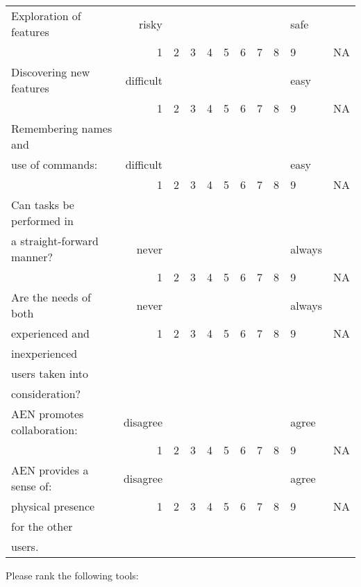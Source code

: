 \begin{table}
\begin{tabular}{lrccccccclc}\\
\hline
Exploration of features&risky&&&&&&&&safe&\\
&1&2&3&4&5&6&7&8&9&NA\\
\hline
Discovering new features&difficult&&&&&&&&easy&\\
&1&2&3&4&5&6&7&8&9&NA\\
\hline
Remembering names and\\
 use of commands:&difficult&&&&&&&&easy&\\
&1&2&3&4&5&6&7&8&9&NA\\
\hline
Can tasks be performed in\\
 a straight-forward manner?&never&&&&&&&&always&\\
&1&2&3&4&5&6&7&8&9&NA\\
\hline
Are the needs of both&never&&&&&&&&always&\\
 experienced and&1&2&3&4&5&6&7&8&9&NA\\
 inexperienced\\
 users taken into\\
 consideration?\\
\hline
AEN promotes collaboration:&disagree&&&&&&&&agree&\\
&1&2&3&4&5&6&7&8&9&NA\\
\hline
AEN provides a sense of:&disagree&&&&&&&&agree&\\
 physical presence&1&2&3&4&5&6&7&8&9&NA\\
 for the other\\
 users.\\
\end{tabular}
\end{table}
\newpage
Please rank the following tools:

